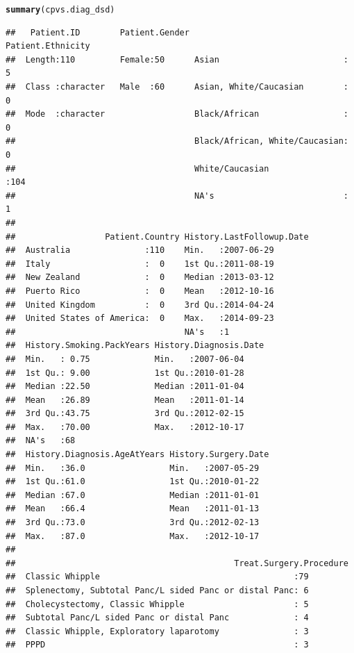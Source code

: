 \documentclass{article}\usepackage[]{graphicx}\usepackage[]{color}
\makeatletter
\newcommand{\hlstd}[1]{\textcolor[rgb]{0.345,0.345,0.345}{#1}}%
\newcommand{\hlkwd}[1]{\textcolor[rgb]{0.737,0.353,0.396}{\textbf{#1}}}%
\newenvironment{kframe}{%
 \def\at@end@of@kframe{}%
 \ifinner\ifhmode%
  \def\at@end@of@kframe{\end{minipage}}%
  \begin{minipage}{\columnwidth}%
 \fi\fi%
 \def\FrameCommand##1{\hskip\@totalleftmargin \hskip-\fboxsep
 \colorbox{shadecolor}{##1}\hskip-\fboxsep
     \hskip-\linewidth \hskip-\@totalleftmargin \hskip\columnwidth}%
 \MakeFramed {\advance\hsize-\width
   \@totalleftmargin\z@ \linewidth\hsize
   \@setminipage}}%
 {\par\unskip\endMakeFramed%
 \at@end@of@kframe}
\newenvironment{knitrout}{}{} %
\makeatother
\begin{document}
\begin{knitrout}
\begin{kframe}
\begin{alltt}
\hlkwd{summary}\hlstd{(cpvs.diag_dsd)}
\end{alltt}
\begin{verbatim}
##   Patient.ID        Patient.Gender                      Patient.Ethnicity
##  Length:110         Female:50      Asian                         :  5    
##  Class :character   Male  :60      Asian, White/Caucasian        :  0    
##  Mode  :character                  Black/African                 :  0    
##                                    Black/African, White/Caucasian:  0    
##                                    White/Caucasian               :104    
##                                    NA's                          :  1    
##                                                                          
##                  Patient.Country History.LastFollowup.Date
##  Australia               :110    Min.   :2007-06-29       
##  Italy                   :  0    1st Qu.:2011-08-19       
##  New Zealand             :  0    Median :2013-03-12       
##  Puerto Rico             :  0    Mean   :2012-10-16       
##  United Kingdom          :  0    3rd Qu.:2014-04-24       
##  United States of America:  0    Max.   :2014-09-23       
##                                  NA's   :1                
##  History.Smoking.PackYears History.Diagnosis.Date
##  Min.   : 0.75             Min.   :2007-06-04    
##  1st Qu.: 9.00             1st Qu.:2010-01-28    
##  Median :22.50             Median :2011-01-04    
##  Mean   :26.89             Mean   :2011-01-14    
##  3rd Qu.:43.75             3rd Qu.:2012-02-15    
##  Max.   :70.00             Max.   :2012-10-17    
##  NA's   :68                                      
##  History.Diagnosis.AgeAtYears History.Surgery.Date
##  Min.   :36.0                 Min.   :2007-05-29  
##  1st Qu.:61.0                 1st Qu.:2010-01-22  
##  Median :67.0                 Median :2011-01-01  
##  Mean   :66.4                 Mean   :2011-01-13  
##  3rd Qu.:73.0                 3rd Qu.:2012-02-13  
##  Max.   :87.0                 Max.   :2012-10-17  
##                                                   
##                                            Treat.Surgery.Procedure
##  Classic Whipple                                       :79        
##  Splenectomy, Subtotal Panc/L sided Panc or distal Panc: 6        
##  Cholecystectomy, Classic Whipple                      : 5        
##  Subtotal Panc/L sided Panc or distal Panc             : 4        
##  Classic Whipple, Exploratory laparotomy               : 3        
##  PPPD                                                  : 3        

\end{verbatim}
\end{kframe}
\end{knitrout}
\end{document}
